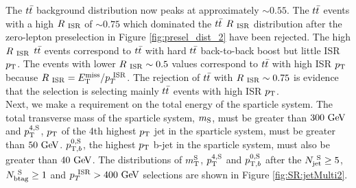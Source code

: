 \indent The $t\bar{t}$ background distribution now peaks at approximately $\sim0.55$.  The $t\bar{t}$ events with a high $R_{~\mathrm{ISR}}$ of $\sim0.75$ which dominated the $t\bar{t}$ $R_{~\mathrm{ISR}}$ distribution after the zero-lepton preselection in Figure \ref{fig:presel_dist_2} have been rejected.  The high $R_{~\mathrm{ISR}}$ $t\bar{t}$ events correspond to $t\bar{t}$ with hard $t\bar{t}$ back-to-back boost but little ISR $p_{\mathrm{T}}$.  The events with lower $R_{~\mathrm{ISR}} \sim0.5$ values correspond to $t\bar{t}$ with high ISR $p_{\mathrm{T}}$ because $R_{~\mathrm{ISR}} = E_{\mathrm{T}}^{\mathrm{miss}}/p_{T}^{~\mathrm{ISR}}$.  The rejection of $t\bar{t}$ with $R_{~\mathrm{ISR}} \sim0.75$ is evidence that the selection is selecting mainly $t\bar{t}$ events with high ISR $p_{\mathrm{T}}$.  \\ 



\indent Next, we make a requirement on the total energy of the sparticle system.  The total transverse mass of the sparticle system, $m_{\mathrm{S}}$, must be greater than $300 \gev$ and $p_{\mathrm{T}}^{4,\mathrm{S}}$, $p_{\mathrm{T}}$ of the 4th highest $p_{\mathrm{T}}$ jet in the sparticle system, must be greater than $50 \gev$.  $p_{\mathrm{T},b}^{0,\mathrm{S}}$, the highest $p_{\mathrm{T}}$ b-jet in the sparticle system, must also be greater than $40 \gev$.   The distributions of $m_{\mathrm{T}}^{\mathrm{S}}$, $p_{\mathrm{T}}^{4,\mathrm{S}}$ and $p_{\mathrm{T},b}^{0,\mathrm{S}}$ after the $N_{\mathrm{jet}}^{~\mathrm{S}} \ge 5$, $N_{\mathrm{btag}}^{~\mathrm{S}} \ge 1$ and $\PTISR > 400 \gev$ selections are shown in Figure \ref{fig:SR:jetMulti2}. \\

